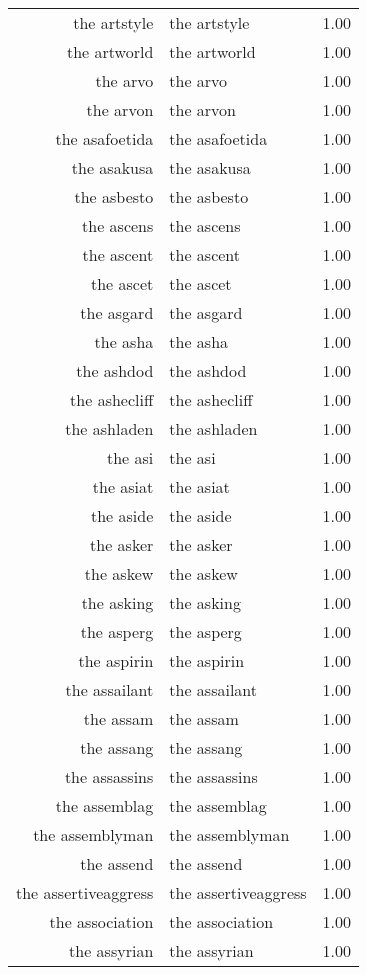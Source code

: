 \begin{table}[ht]
\begin{tabular}{rlr}
  the artstyle & the artstyle & 1.00 \\ 
  the artworld & the artworld & 1.00 \\ 
  the arvo & the arvo & 1.00 \\ 
  the arvon & the arvon & 1.00 \\ 
  the asafoetida & the asafoetida & 1.00 \\ 
  the asakusa & the asakusa & 1.00 \\ 
  the asbesto & the asbesto & 1.00 \\ 
  the ascens & the ascens & 1.00 \\ 
  the ascent & the ascent & 1.00 \\ 
  the ascet & the ascet & 1.00 \\ 
  the asgard & the asgard & 1.00 \\ 
  the asha & the asha & 1.00 \\ 
  the ashdod & the ashdod & 1.00 \\ 
  the ashecliff & the ashecliff & 1.00 \\ 
  the ashladen & the ashladen & 1.00 \\ 
  the asi & the asi & 1.00 \\ 
  the asiat & the asiat & 1.00 \\ 
  the aside & the aside & 1.00 \\ 
  the asker & the asker & 1.00 \\ 
  the askew & the askew & 1.00 \\ 
  the asking & the asking & 1.00 \\ 
  the asperg & the asperg & 1.00 \\ 
  the aspirin & the aspirin & 1.00 \\ 
  the assailant & the assailant & 1.00 \\ 
  the assam & the assam & 1.00 \\ 
  the assang & the assang & 1.00 \\ 
  the assassins & the assassins & 1.00 \\ 
  the assemblag & the assemblag & 1.00 \\ 
  the assemblyman & the assemblyman & 1.00 \\ 
  the assend & the assend & 1.00 \\ 
  the assertiveaggress & the assertiveaggress & 1.00 \\ 
  the association & the association & 1.00 \\ 
  the assyrian & the assyrian & 1.00 \\ 

\end{tabular}
\end{table}
